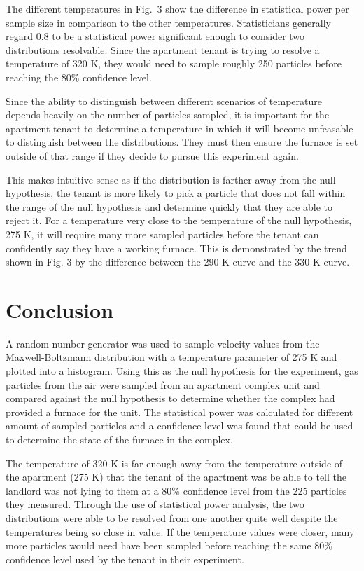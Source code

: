 \documentclass[%
 reprint,
 amsmath,amssymb,
 aps,
]{revtex4-2}
\begin{document}
The different temperatures in Fig.\ 3 show the difference in statistical power per sample size in comparison to the other temperatures. Statisticians generally regard 0.8 to be a statistical power significant enough to consider two distributions resolvable. Since the apartment tenant is trying to resolve a temperature of 320 K, they would need to sample roughly 250 particles before reaching the 80\% confidence level.

Since the ability to distinguish between different scenarios of temperature depends heavily on the number of particles sampled, it is important for the apartment tenant to determine a temperature in which it will become unfeasable to distinguish between the distributions. They must then ensure the furnace is set outside of that range if they decide to pursue this experiment again. 

This makes intuitive sense as if the distribution is farther away from the null hypothesis, the tenant is more likely to pick a particle that does not fall within the range of the null hypothesis and determine quickly that they are able to reject it. For a temperature very close to the temperature of the null hypothesis, 275 K, it will require many more sampled particles before the tenant can confidently say they have a working furnace. This is demonstrated by the trend shown in Fig. 3 by the difference between the 290 K curve and the 330 K curve. 

\section{Conclusion}

A random number generator was used to sample velocity values from the Maxwell-Boltzmann distribution with a temperature parameter of 275 K and plotted into a histogram. Using this as the null hypothesis for the experiment, gas particles from the air were sampled from an apartment complex unit and compared against the null hypothesis to determine whether the complex had provided a furnace for the unit. The statistical power was calculated for different amount of sampled particles and a confidence level was found that could be used to determine the state of the furnace in the complex.

The temperature of 320 K is far enough away from the temperature outside of the apartment (275 K) that the tenant of the apartment was be able to tell the landlord was not lying to them at a 80\% confidence level from the 225 particles they measured. Through the use of statistical power analysis, the two distributions were able to be resolved from one another quite well despite the temperatures being so close in value. If the temperature values were closer, many more particles would need have been sampled before reaching the same 80\% confidence level used by the tenant in their experiment. 
\end{document}
